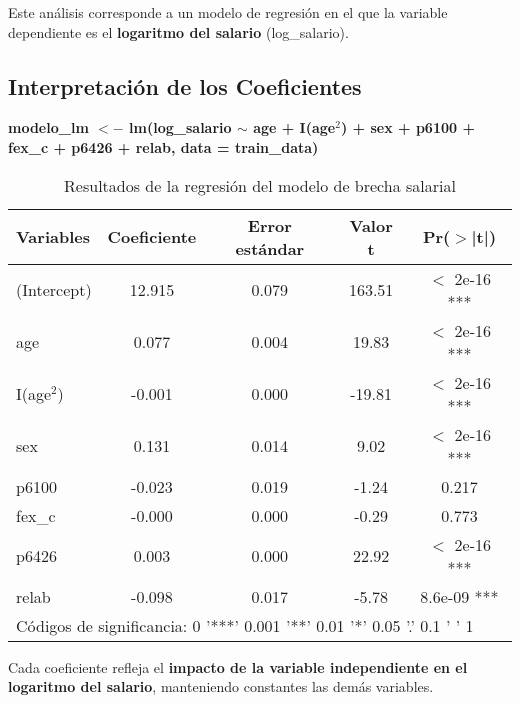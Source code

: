 \documentclass[12pt,a4paper,onecolumn]{article}
\begin{document}
Este análisis corresponde a un modelo de regresión en el que la variable dependiente es el \textbf{logaritmo del salario} (log\_salario).

\subsection{Interpretación de los Coeficientes}

\textbf{modelo\_lm $<-$ lm(log\_salario $\sim$ age + I(age$^2$) + sex + p6100 + fex\_c + p6426 + relab, data = train\_data)}

\begin{table}[htbp]
    \centering
    \caption{Resultados de la regresión del modelo de brecha salarial}
    \label{tab:wage_gap_model}
    \begin{tabular}{lcccc}
    \toprule
    \textbf{Variables} & \textbf{Coeficiente} & \textbf{Error estándar} & \textbf{Valor t} & \textbf{Pr($>$|t|)} \\
    \midrule
    (Intercept) & 12.915 & 0.079 & 163.51 & $<$ 2e-16 *** \\
    age & 0.077 & 0.004 & 19.83 & $<$ 2e-16 *** \\
    I(age$^2$) & -0.001 & 0.000 & -19.81 & $<$ 2e-16 *** \\
    sex & 0.131 & 0.014 & 9.02 & $<$ 2e-16 *** \\
    p6100 & -0.023 & 0.019 & -1.24 & 0.217 \\
    fex\_c & -0.000 & 0.000 & -0.29 & 0.773 \\
    p6426 & 0.003 & 0.000 & 22.92 & $<$ 2e-16 *** \\
    relab & -0.098 & 0.017 & -5.78 & 8.6e-09 *** \\
    \bottomrule
    \multicolumn{5}{l}{\tiny{Códigos de significancia: 0 '***' 0.001 '**' 0.01 '*' 0.05 '.' 0.1 ' ' 1}}
    \end{tabular}
\end{table}

Cada coeficiente refleja el \textbf{impacto de la variable independiente en el logaritmo del salario}, manteniendo constantes las demás variables.
\end{document}
